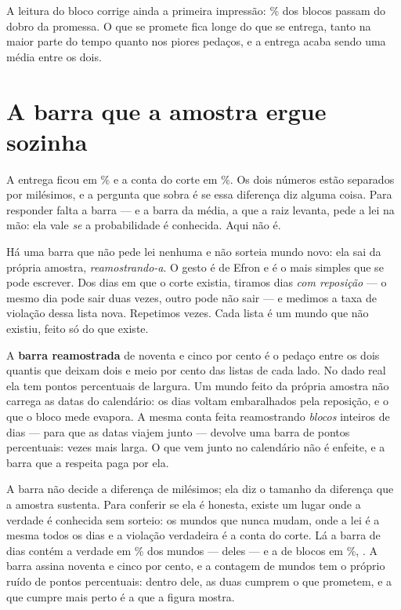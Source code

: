 A leitura do bloco corrige ainda a primeira impressão: \numBlocoAcimaDoDobroPct\% dos blocos
passam do dobro da promessa. O que se promete fica longe do que se entrega, tanto na maior
parte do tempo quanto nos piores pedaços, e a entrega acaba sendo uma média entre os dois.

\section{A barra que a amostra ergue sozinha}

A entrega ficou em \numEntregaTaxaPct\% e a conta do corte em \numCorteContaPct\%. Os dois
números estão separados por milésimos, e a pergunta que sobra é se essa diferença diz alguma
coisa. Para responder falta a barra --- e a barra da média, a que a raiz levanta, pede a lei na
mão: ela vale \emph{se} a probabilidade é conhecida. Aqui não é.

Há uma barra que não pede lei nenhuma e não sorteia mundo novo: ela sai da própria amostra,
\emph{reamostrando-a}. O gesto é de Efron \cite{efron1979bootstrap} e é o mais simples que se
pode escrever. Dos \numEntregaDias{} dias em que o corte existia, tiramos \numEntregaDias{} dias
\emph{com reposição} --- o mesmo dia pode sair duas vezes, outro pode não sair --- e medimos a
taxa de violação dessa lista nova. Repetimos \numBootReamostragens{} vezes. Cada lista é um
mundo que não existiu, feito só do que existe.

A \textbf{barra reamostrada} de noventa e cinco por cento é o pedaço entre os dois quantis que
deixam dois e meio por cento das listas de cada lado. No dado real ela tem
\numBootLarguraDiaPp{} pontos percentuais de largura. Um mundo feito da própria amostra não
carrega as datas do calendário: os dias voltam embaralhados pela reposição, e o que
o bloco mede evapora. A mesma conta feita reamostrando \emph{blocos} inteiros de \numBlocoDias{}
dias --- para que as datas viajem junto --- devolve uma barra de \numBootLarguraBlocoPp{} pontos
percentuais: \numBootLarguraRazao{} vezes mais larga. O que vem junto no calendário não é enfeite, e a barra que
a respeita paga por ela.

A barra não decide a diferença de milésimos; ela diz o tamanho da diferença que a amostra
sustenta. Para conferir se ela é honesta, existe um lugar onde a verdade é conhecida sem
sorteio: os \numNuncaMudaMundos{} mundos que nunca mudam, onde a lei é a mesma todos os dias e a
violação verdadeira é a conta do corte. Lá a barra de dias contém a verdade em
\numBootCoberturaDiaPct\% dos mundos --- \numBootMundosCobertosDia{} deles --- e a de blocos em
\numBootCoberturaBlocoPct\%, \numBootMundosCobertosBloco{}. A barra assina noventa e cinco por
cento, e a contagem de \numNuncaMudaMundos{} mundos tem o próprio ruído de
\numBootCoberturaMargemPct{} pontos percentuais: dentro dele, as duas cumprem o que prometem, e
a que cumpre mais perto é a que a figura mostra.

